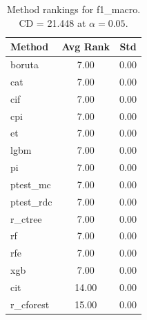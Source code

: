 \begin{table}[h]
\centering
\caption{Method rankings for f1_macro. CD = 21.448 at $\alpha=0.05$.}
\label{tab:ranks_f1_macro}
\begin{tabular}{lcc}
\toprule
Method & Avg Rank & Std \\
\midrule
boruta & 7.00 & 0.00 \\
cat & 7.00 & 0.00 \\
cif & 7.00 & 0.00 \\
cpi & 7.00 & 0.00 \\
et & 7.00 & 0.00 \\
lgbm & 7.00 & 0.00 \\
pi & 7.00 & 0.00 \\
ptest_mc & 7.00 & 0.00 \\
ptest_rdc & 7.00 & 0.00 \\
r_ctree & 7.00 & 0.00 \\
rf & 7.00 & 0.00 \\
rfe & 7.00 & 0.00 \\
xgb & 7.00 & 0.00 \\
cit & 14.00 & 0.00 \\
r_cforest & 15.00 & 0.00 \\
\bottomrule
\end{tabular}
\end{table}